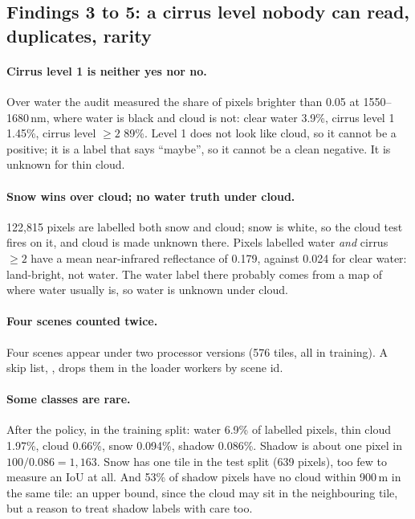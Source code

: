 \subsection{Findings 3 to 5: a cirrus level nobody can read, duplicates, rarity}

\paragraph{Cirrus level 1 is neither yes nor no.} Over water the audit measured the share of pixels brighter than 0.05 at 1550--1680\,nm, where water
is black and cloud is not: clear water 3.9\%, cirrus level 1 1.45\%, cirrus level $\ge 2$ 89\%. Level 1 does not look like cloud, so it cannot be a
positive; it is a label that says ``maybe'', so it cannot be a clean negative. It is unknown for thin cloud.

\paragraph{Snow wins over cloud; no water truth under cloud.} 122,815 pixels are labelled both snow and cloud; snow is white, so the cloud test fires
on it, and cloud is made unknown there. Pixels labelled water \emph{and} cirrus $\ge 2$ have a mean near-infrared reflectance of 0.179, against 0.024
for clear water: land-bright, not water. The water label there probably comes from a map of where water usually is, so water is unknown under cloud.

\paragraph{Four scenes counted twice.} Four scenes appear under two processor versions (576 tiles, all in training). A skip list,
, drops them in the loader workers by scene id.

\paragraph{Some classes are rare.} After the policy, in the training split: water 6.9\% of labelled pixels, thin cloud 1.97\%, cloud 0.66\%, snow
0.094\%, shadow 0.086\%. Shadow is about one pixel in $100 / 0.086 = 1{,}163$. Snow has one tile in the test split (639 pixels), too few to measure an
IoU at all. And 53\% of shadow pixels have no cloud within 900\,m in the same tile: an upper bound, since the cloud may sit in the neighbouring tile,
but a reason to treat shadow labels with care too.

